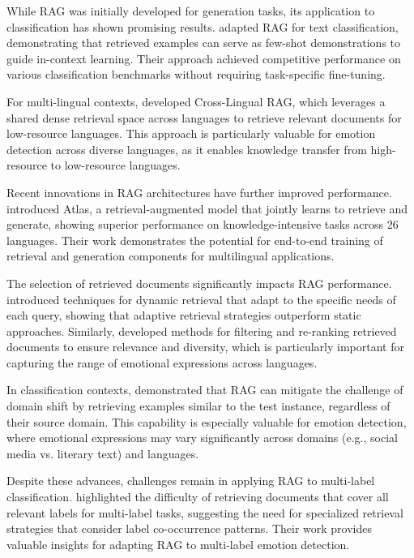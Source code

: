 \documentclass[a4paper,12pt]{extarticle}
\begin{document}
While RAG was initially developed for generation tasks, its application to classification has shown promising results. \cite{mallen2023retrieval} adapted RAG for text classification, demonstrating that retrieved examples can serve as few-shot demonstrations to guide in-context learning. Their approach achieved competitive performance on various classification benchmarks without requiring task-specific fine-tuning.

For multi-lingual contexts, \cite{shi2023replug} developed Cross-Lingual RAG, which leverages a shared dense retrieval space across languages to retrieve relevant documents for low-resource languages. This approach is particularly valuable for emotion detection across diverse languages, as it enables knowledge transfer from high-resource to low-resource languages.

Recent innovations in RAG architectures have further improved performance. \cite{izacard2022atlas} introduced Atlas, a retrieval-augmented model that jointly learns to retrieve and generate, showing superior performance on knowledge-intensive tasks across 26 languages. Their work demonstrates the potential for end-to-end training of retrieval and generation components for multilingual applications.

The selection of retrieved documents significantly impacts RAG performance. \cite{gao2023retrieval} introduced techniques for dynamic retrieval that adapt to the specific needs of each query, showing that adaptive retrieval strategies outperform static approaches. Similarly, \cite{yu2023improving} developed methods for filtering and re-ranking retrieved documents to ensure relevance and diversity, which is particularly important for capturing the range of emotional expressions across languages.

In classification contexts, \cite{singh2022flare} demonstrated that RAG can mitigate the challenge of domain shift by retrieving examples similar to the test instance, regardless of their source domain. This capability is especially valuable for emotion detection, where emotional expressions may vary significantly across domains (e.g., social media vs. literary text) and languages.

Despite these advances, challenges remain in applying RAG to multi-label classification. \cite{glass2022re} highlighted the difficulty of retrieving documents that cover all relevant labels for multi-label tasks, suggesting the need for specialized retrieval strategies that consider label co-occurrence patterns. Their work provides valuable insights for adapting RAG to multi-label emotion detection.
\end{document}
